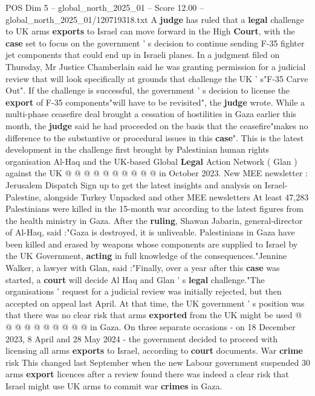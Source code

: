 \begin{textsample}{POS Dim 5 – global\_north\_2025\_01 – Score 12.00 – global\_north\_2025\_01/120719318.txt}  \label{ex:f5_pos_390}
A \textbf{judge} has ruled that a \textbf{legal} challenge to UK arms \textbf{exports} to Israel can move forward in the High \textbf{Court}, with the \textbf{case} set to focus on the government ' s decision to continue sending F-35 fighter jet components that could end up in Israeli planes.
In a judgment filed on Thursday, Mr Justice Chamberlain said he was granting permission for a judicial review that will look specifically at grounds that challenge the UK ' s"F-35 Carve Out".
If the challenge is successful, the government ' s decision to license the \textbf{export} of F-35 components"will have to be revisited", the \textbf{judge} wrote.
While a multi-phase ceasefire deal brought a cessation of hostilities in Gaza earlier this month, the \textbf{judge} said he had proceeded on the basis that the ceasefire"makes no difference to the substantive or procedural issues in this \textbf{case}".
This is the latest development in the challenge first brought by Palestinian human rights organisation Al-Haq and the UK-based Global \textbf{Legal} Action Network ( Glan ) against the UK @ @ @ @ @ @ @ @ @ @ in October 2023.
New MEE newsletter : Jerusalem Dispatch Sign up to get the latest insights and analysis on Israel-Palestine, alongside Turkey Unpacked and other MEE newsletters At least 47,283 Palestinians were killed in the 15-month war according to the latest figures from the health ministry in Gaza.
After the \textbf{ruling}, Shawan Jabarin, general-director of Al-Haq, said :"Gaza is destroyed, it is unliveable.
Palestinians in Gaza have been killed and erased by weapons whose components are supplied to Israel by the UK Government, \textbf{acting} in full knowledge of the consequences."Jennine Walker, a lawyer with Glan, said :"Finally, over a year after this \textbf{case} was started, a \textbf{court} will decide Al Haq and Glan ' s \textbf{legal} challenge."The organisations ' request for a judicial review was initially rejected, but then accepted on appeal last April.
At that time, the UK government ' s position was that there was no clear risk that arms \textbf{exported} from the UK might be used @ @ @ @ @ @ @ @ @ @ in Gaza.
On three separate occasions - on 18 December 2023, 8 April and 28 May 2024 - the government decided to proceed with licensing all arms \textbf{exports} to Israel, according to \textbf{court} documents.
War \textbf{crime} risk This changed last September when the new Labour government suspended 30 arms \textbf{export} licences after a review found there was indeed a clear risk that Israel might use UK arms to commit war \textbf{crimes} in Gaza.

\end{textsample}
